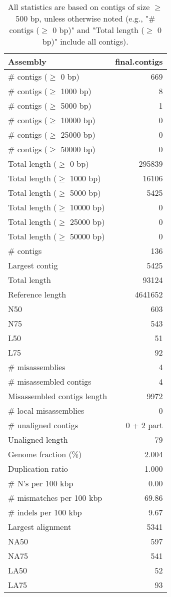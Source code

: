 \documentclass[12pt,a4paper]{article}
\begin{document}
\begin{table}[ht]
\begin{center}
\caption{All statistics are based on contigs of size $\geq$ 500 bp, unless otherwise noted (e.g., "\# contigs ($\geq$ 0 bp)" and "Total length ($\geq$ 0 bp)" include all contigs).}
\begin{tabular}{|l*{1}{|r}|}
\hline
Assembly & final.contigs \\ \hline
\# contigs ($\geq$ 0 bp) & 669 \\ \hline
\# contigs ($\geq$ 1000 bp) & 8 \\ \hline
\# contigs ($\geq$ 5000 bp) & 1 \\ \hline
\# contigs ($\geq$ 10000 bp) & 0 \\ \hline
\# contigs ($\geq$ 25000 bp) & 0 \\ \hline
\# contigs ($\geq$ 50000 bp) & 0 \\ \hline
Total length ($\geq$ 0 bp) & 295839 \\ \hline
Total length ($\geq$ 1000 bp) & 16106 \\ \hline
Total length ($\geq$ 5000 bp) & 5425 \\ \hline
Total length ($\geq$ 10000 bp) & 0 \\ \hline
Total length ($\geq$ 25000 bp) & 0 \\ \hline
Total length ($\geq$ 50000 bp) & 0 \\ \hline
\# contigs & 136 \\ \hline
Largest contig & 5425 \\ \hline
Total length & 93124 \\ \hline
Reference length & 4641652 \\ \hline
N50 & 603 \\ \hline
N75 & 543 \\ \hline
L50 & 51 \\ \hline
L75 & 92 \\ \hline
\# misassemblies & 4 \\ \hline
\# misassembled contigs & 4 \\ \hline
Misassembled contigs length & 9972 \\ \hline
\# local misassemblies & 0 \\ \hline
\# unaligned contigs & 0 + 2 part \\ \hline
Unaligned length & 79 \\ \hline
Genome fraction (\%) & 2.004 \\ \hline
Duplication ratio & 1.000 \\ \hline
\# N's per 100 kbp & 0.00 \\ \hline
\# mismatches per 100 kbp & 69.86 \\ \hline
\# indels per 100 kbp & 9.67 \\ \hline
Largest alignment & 5341 \\ \hline
NA50 & 597 \\ \hline
NA75 & 541 \\ \hline
LA50 & 52 \\ \hline
LA75 & 93 \\ \hline
\end{tabular}
\end{center}
\end{table}
\end{document}
